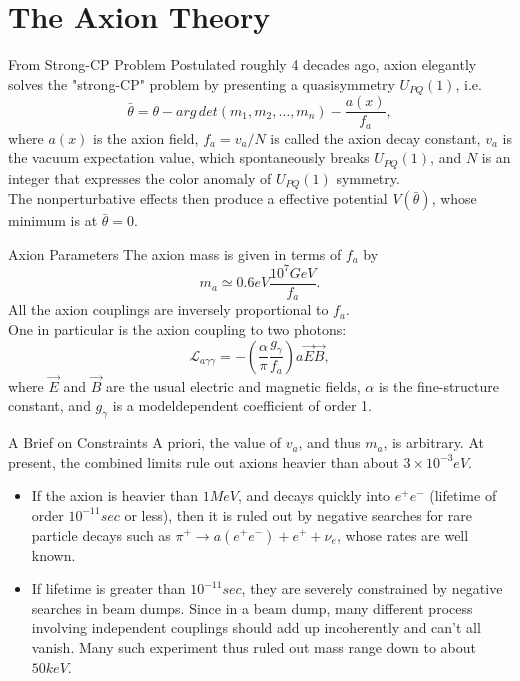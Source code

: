 \documentclass{beamer}
\begin{document}
\section{The Axion Theory}
\begin{frame}{From Strong-CP Problem}
Postulated roughly 4 decades ago, axion elegantly solves the "strong-CP" problem by presenting a quasisymmetry $U_{PQ}(1)$, i.e.
$$\bar{\theta} = \theta - arg \, det(m_1,m_2, \ldots, m_n) - \frac{a(x)}{f_a},$$
where $a(x)$ is the axion field, $f_a = v_a/N$ is called the axion decay constant, $v_a$ is the vacuum expectation value,
which spontaneously breaks $U_{PQ}(1)$, and $N$ is an integer that expresses the color anomaly of $U_{PQ}(1)$ symmetry.
\\
\vspace{1cm}
The nonperturbative effects then produce a effective potential $V(\bar{\theta})$, whose minimum is at $\bar{\theta} = 0$.
\end{frame}
\begin{frame}{Axion Parameters}
The axion mass is given in terms of $f_a$ by$$
m_a \simeq 0.6 eV \frac{10^7GeV}{f_a}.$$
All the axion couplings are inversely proportional to $f_a$.
\\One in particular is the axion coupling to two
photons:$$
\mathcal{L}_{a \gamma \gamma} = -(\frac{\alpha}{\pi} \frac{g_{\gamma}}{f_a}) a \vec{E} \vec{B},$$
where $\vec{E}$ and $\vec{B}$ are the usual electric and magnetic
fields, $\alpha$ is the fine-structure constant, and $g_{\gamma}$
is a modeldependent coefficient of order 1.
\end{frame}
\begin{frame}{A Brief on Constraints}
A priori, the value of $v_a$, and thus $m_a$, is arbitrary. At present, the combined limits rule out axions heavier than about $3 \times 10^{-3}eV$.
\begin{itemize}
\item If the axion is heavier than $1 MeV$, and decays quickly into $e^+ e^-$ (lifetime of order $10^{-11} sec$ or less), then it is ruled out by negative searches for rare particle decays such as $\pi^+ \rightarrow a(e^+ e^-)+e^++\nu_e$, whose rates are well known.
\item If lifetime is greater than $10^{-11} sec$, they are severely constrained by negative searches in beam dumps. Since in a beam dump, many different process involving independent couplings should add up incoherently and can't all vanish. Many such experiment thus ruled out mass range down to about $50 keV$. 
\end{itemize}
\end{frame}
\end{document}
